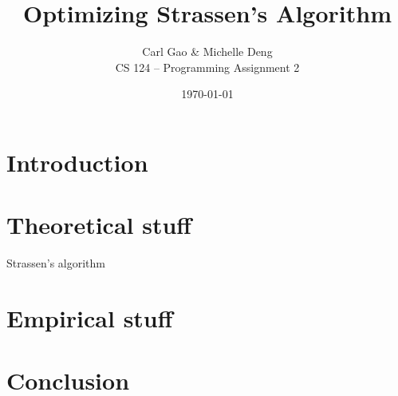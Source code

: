 \documentclass[10pt]{article}
\title{ \vspace{-4ex} Optimizing Strassen's Algorithm\vspace{-1ex}}
\author{Carl Gao \& Michelle Deng\\ CS 124 -- Programming Assignment 2}
\date{ \vspace{-3ex} \today}
\begin{document}
\maketitle

 \vspace{-.4in}

\section{Introduction}

\section {Theoretical stuff}
Strassen's algorithm 




\section {Empirical stuff}




\section {Conclusion}
\end{document}
